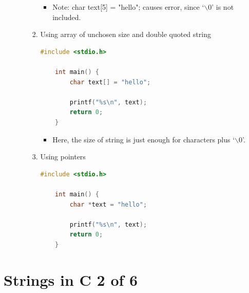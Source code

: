 \documentclass[12pt]{article}
\begin{document}
\begin{itemize}
\begin{itemize}
\begin{enumerate}[1.]
\begin{itemize}
                \item Note: char text[5] = "hello"; causes error, since `$\backslash0$'
                is not included.
            \end{itemize}

            \item Using array of unchosen size and double quoted string

    \begin{lstlisting}[language=c]
    #include <stdio.h>

    int main() {
        char text[] = "hello";

        printf("%s\n", text);
        return 0;
    }
    \end{lstlisting}

            \begin{itemize}
                \item Here, the size of string is just enough for characters plus `$\backslash0$'.
            \end{itemize}

            \item Using pointers


    \begin{lstlisting}[language=c]
    #include <stdio.h>

    int main() {
        char *text = "hello";

        printf("%s\n", text);
        return 0;
    }
    \end{lstlisting}

        \end{enumerate}
    \end{itemize}
\end{itemize}


\bigskip

\section*{Strings in C 2 of 6}

\bigskip
\end{document}

